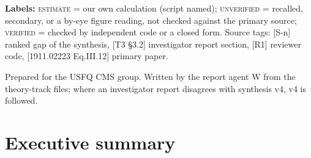 \documentclass[11pt,a4paper]{article}
\newcommand{\EST}{\textsc{estimate}}
\newcommand{\UNV}{\textsc{unverified}}
\newcommand{\VER}{\textsc{verified}}
\newcommand{\src}[1]{{\color{mid}[#1]}}
\begin{document}
\begin{titlepage}
\begin{minipage}{0.86\textwidth}
\textbf{Labels:} \EST{} = our own calculation (script named); \UNV{} = recalled, secondary, or a by-eye figure reading, not checked against the primary source; \VER{} = checked by independent code or a closed form. Source tags: \src{S-n} ranked gap of the synthesis, \src{T3 \S3.2} investigator report section, \src{R1} reviewer code, \src{1911.02223 Eq.III.12} primary paper.
\end{minipage}
\vfill
{\small Prepared for the USFQ CMS group. Written by the report agent W from the theory-track files; where an investigator report disagrees with synthesis v4, v4 is followed.}
\end{titlepage}

\section*{Executive summary}
\vspace{-4pt}
\end{document}
